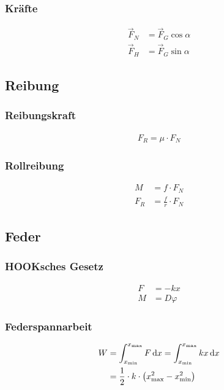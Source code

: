 \subsubsection{Kräfte}
\begin{align*}
\vec{F}_N&=\vec{F}_G\cos\alpha\\
\vec{F}_H&=\vec{F}_G\sin\alpha
\end{align*}


\subsection{Reibung}

\begin{multicols}{2}{}
\subsubsection{Reibungskraft}
\begin{align*}
F_R=\mu\cdot F_N
\end{align*}
\vfill
\subsubsection{Rollreibung}
\begin{align*}
M&=f\cdot F_N\\
F_R&=\frac{f}{r}\cdot F_N
\end{align*}
\vfill
\end{multicols}

\newpage
\subsection{Feder}

\begin{multicols}{2}{}
\subsubsection{HOOKsches Gesetz}
\begin{align*}
F&=-kx\\
M&=D\varphi
\end{align*}

\subsubsection{Federspannarbeit}
\begin{align*}
W	&=\int_{x_\text{min}}^{x_\text{max}}F\mathop{}\!\mathrm{d} x=\int_{x_\text{min}}^{x_\text{max}}kx\mathop{}\!\mathrm{d} x\\
	&=\frac{1}{2}\cdot k\cdot \left(x_{\text{max}}^2-x_{\text{min}}^2\right)
\end{align*}
\end{multicols}

